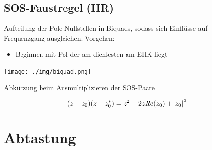 \documentclass[10pt,a4paper]{article}
\begin{document}
\subsection{SOS-Faustregel (IIR)}
Aufteilung der Pole-Nullstellen in Biquads, sodass sich Einflüsse auf Frequenzgang ausgleichen.
Vorgehen:
\begin{itemize}
    \item Beginnen mit Pol der am dichtesten am EHK liegt
\end{itemize}
  \begin{center}
      \texttt{[image: ./img/biquad.png]}
  \end{center}
Abkürzung beim Ausmultiplizieren der SOS-Paare
  \begin{mdframed}[style=exercise]
    \begin{align}
        (z-z_0)(z-z_0^*) = z^2 - 2zRe(z_0)+\abs{z_0}^2
    \end{align}
  \end{mdframed}
\section{Abtastung}
\end{document}
